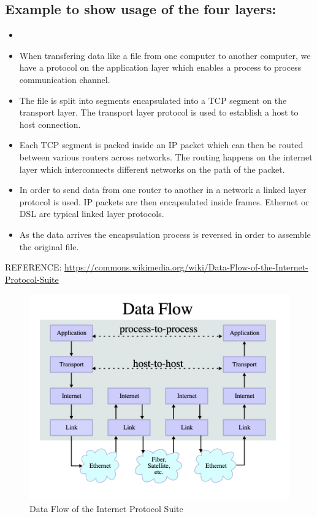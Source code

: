 \documentclass{resources/WeSTassignment}
\begin{document}
\begin{enumerate}
\subsection{Example to show usage of the four layers:}
\begin{itemize}
    	\item 
	\item When transfering data like a file from one computer to another computer, we have a protocol on the application layer which enables a process to process communication channel.
	\item The file is split into segments encapsulated into a TCP segment on the transport layer. The transport layer protocol is used to establish a host to host connection.
	\item Each TCP segment is packed inside an IP packet which can then be routed between various routers across networks. The routing happens on the internet layer which interconnects different networks on the path of the packet.
	\item In order to send data from one router to another in a network a linked layer protocol is used. IP packets are then encapsulated inside frames. Ethernet or DSL are typical linked layer protocols.
	\item As the data arrives the encapsulation process is reversed in order to assemble the original file.
\end{itemize}
\bigbreak   REFERENCE: \href{https://commons.wikimedia.org/wiki/File:Data_Flow_of_the_Internet_Protocol_Suite.PNG}{https://commons.wikimedia.org/wiki/Data-Flow-of-the-Internet-Protocol-Suite}
\begin{figure}[h!]
  \includegraphics[width=\linewidth]{resources/data-flow.png}
  \caption{Data Flow of the Internet Protocol Suite}
  \label{Data Flow of the Internet Protocol Suite}
\end{figure}


\end{enumerate}
\end{document}

